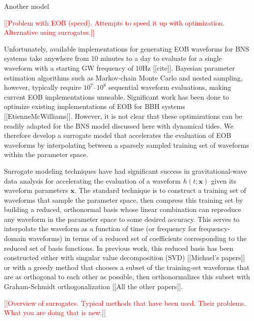 \documentclass[prd,aps,letter,twocolumn,floatfix,notitlepage,nofootinbib]{revtex4-1}
\def\bx{\mathbf{x}}
\newcommand{\red}[1]{\textcolor{red}{#1}}
\begin{document}
Another model 


\red{[[Problem with EOB (speed). Attempts to speed it up with optimization. Alternative using surrogates.]]}

Unfortunately, available implementations for generating EOB waveforms for BNS systems take anywhere from 10 minutes to a day to evaluate for a single waveform with a starting GW frequency of 10Hz [[cite]]. Bayesian parameter estimation algorithms such as Markov-chain Monte Carlo and nested sampling, however, typically require $10^7$--$10^8$ sequential waveform evaluations, making current EOB implementations unusable. Significant work has been done to optimize existing implementations of EOB for BBH systems [[EtienneMcWilliams]]. However, it is not clear that these optimizations can be readily adapted for the BNS model discussed here with dynamical tides. We therefore develop a surrogate model that accelerates the evaluation of EOB waveforms by interpolating between a sparsely sampled training set of waveforms within the parameter space. 

Surrogate modeling techniques have had significant success in gravitational-wave data analysis for accelerating the evaluation of a waveform $h(t;\bx)$ given its waveform parameters $\bx$. The standard technique is to construct a training set of waveforms that sample the parameter space, then compress this training set by building a reduced, orthonormal basis whose linear combination can reproduce any waveform in the parameter space to some desired accuracy. This serves to interpolate the waveform as a function of time (or frequency for frequency-domain waveforms) in terms of a reduced set of coefficients corresponding to the reduced set of basis functions. In previous work, this reduced basis has been constructed either with singular value decomposition (SVD) [[Michael's papers]] or with a greedy method that chooses a subset of the training-set waveforms that are as orthogonal to each other as possible, then orthonormalizes this subset with Graham-Schmidt orthogonalization [[All the other papers]].

\red{[[Overview of surrogates. Typical methods that have been used. Their problems. What you are doing that is new.]]}
\end{document}
